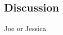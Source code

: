 \documentclass[twoside]{article}
\begin{document}
\begin{multicols}{2}

\section{Discussion}
Joe or Jessica





\end{multicols}
\end{document}
